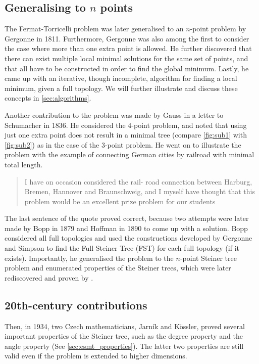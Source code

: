 \documentclass{l4proj}
\begin{document}
\subsection{Generalising to $n$ points}
\label{sec:gergonne}
The Fermat-Torricelli problem was later generalised to an $n$-point problem by Gergonne in 1811. Furthermore, Gergonne was also among the first to consider the case where more than one extra point is allowed. He further discovered that there can exist multiple local minimal solutions for the same set of points, and that all have to be constructed in order to find the global minimum. Lastly, he came up with an iterative, though incomplete, algorithm for finding a local minimum, given a full topology. We will further illustrate and discuss these concepts in \ref{sec:algorithms}.

Another contribution to the problem was made by Gauss in a letter to Schumacher in 1836. He considered the 4-point problem, and noted that using just one extra point does not result in a minimal tree (compare \ref{fig:sub1} with \ref{fig:sub2}) as in the case of the 3-point problem. He went on to illustrate the problem with the example of connecting German cities by railroad with minimal total length.
\begin{quote}
    I have on occasion considered the rail- road connection between Harburg, Bremen, Hannover and Braunschweig, and I myself have thought that this problem would be an excellent prize problem for our students
\end{quote}

The last sentence of the quote proved correct, because two attempts were later made by Bopp in 1879 and Hoffman in 1890 to come up with a solution. Bopp considered all full topologies and used the constructions developed by Gergonne and Simpson to find the Full Steiner Tree (FST) for each full topology (if it exists). Importantly, he generalised the problem to the $n$-point Steiner tree problem and enumerated properties of the Steiner trees, which were later rediscovered and proven by \cite{Gilbert1968SteinerMT}.

\subsection{20th-century contributions}
Then, in 1934, two Czech mathematicians, Jarník and Kössler, proved several important properties of the Steiner tree, such as the degree property and the angle property (See \ref{sec:esmt_properties}). The latter two properties are still valid even if the problem is extended to higher dimensions.
\end{document}

